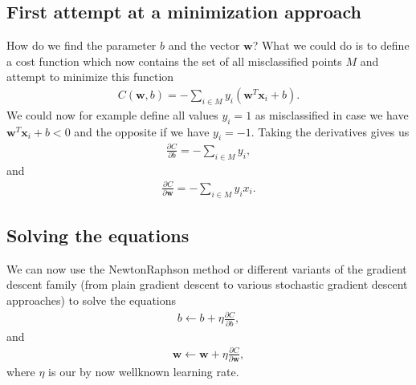 \documentclass[letterpaper,10pt,english]{sphinxmanual}
\begin{document}
\subsection{First attempt at a minimization approach}
\label{\detokenize{chapter7:first-attempt-at-a-minimization-approach}}
How do we find the parameter \(b\) and the vector \(\boldsymbol{w}\)? What we could
do is to define a cost function which now contains the set of all
misclassified points \(M\) and attempt to minimize this function
\begin{equation*}
\begin{split}
C(\boldsymbol{w},b) = -\sum_{i\in M} y_i(\boldsymbol{w}^T\boldsymbol{x}_i+b).
\end{split}
\end{equation*}
We could now for example define all values \(y_i =1\) as misclassified in case we have \(\boldsymbol{w}^T\boldsymbol{x}_i+b < 0\) and the opposite if we have \(y_i=-1\). Taking the derivatives gives us
\begin{equation*}
\begin{split}
\frac{\partial C}{\partial b} = -\sum_{i\in M} y_i,
\end{split}
\end{equation*}
and
\begin{equation*}
\begin{split}
\frac{\partial C}{\partial \boldsymbol{w}} = -\sum_{i\in M} y_ix_i.
\end{split}
\end{equation*}

\subsection{Solving the equations}
\label{\detokenize{chapter7:solving-the-equations}}
We can now use the Newton\sphinxhyphen{}Raphson method or different variants of the gradient descent family (from plain gradient descent to various stochastic gradient descent approaches) to solve the equations
\begin{equation*}
\begin{split}
b \leftarrow b +\eta \frac{\partial C}{\partial b},
\end{split}
\end{equation*}
and
\begin{equation*}
\begin{split}
\boldsymbol{w} \leftarrow \boldsymbol{w} +\eta \frac{\partial C}{\partial \boldsymbol{w}},
\end{split}
\end{equation*}
where \(\eta\) is our by now well\sphinxhyphen{}known learning rate.
\end{document}
